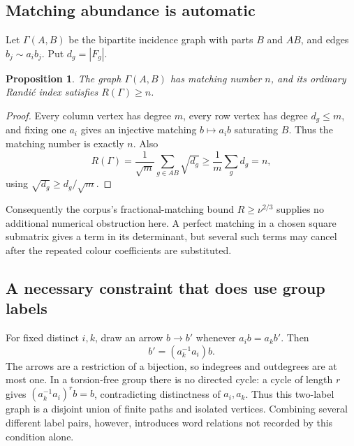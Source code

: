 \documentclass[11pt,a4paper,oneside]{report}
\newtheorem{proposition}[theorem]{Proposition}
\theoremstyle{definition}
\theoremstyle{remark}
\begin{document}
\subsection{Matching abundance is automatic}
Let \(\Gamma(A,B)\) be the bipartite incidence graph with parts \(B\) and \(AB\), and edges \(b_j\sim a_i b_j\). Put \(d_g=|F_g|\).
\begin{proposition}\label{M02:prop:matching}
The graph \(\Gamma(A,B)\) has matching number \(n\), and its ordinary Randi\'c index satisfies \(R(\Gamma)\ge n\).
\end{proposition}
\begin{proof}
Every column vertex has degree \(m\), every row vertex has degree \(d_g\le m\), and fixing one \(a_i\) gives an injective matching \(b\mapsto a_i b\) saturating \(B\). Thus the matching number is exactly \(n\). Also
\[
R(\Gamma)=\frac1{\sqrt m}\sum_{g\in AB}\sqrt{d_g}
\ge\frac1m\sum_gd_g=n,
\]
using \(\sqrt{d_g}\ge d_g/\sqrt m\).
\end{proof}
Consequently the corpus's fractional-matching bound \(R\ge\nu^{2/3}\) supplies no additional numerical obstruction here. A perfect matching in a chosen square submatrix gives a term in its determinant, but several such terms may cancel after the repeated colour coefficients are substituted.

\subsection{A necessary constraint that does use group labels}
For fixed distinct \(i,k\), draw an arrow \(b\to b'\) whenever \(a_i b=a_k b'\). Then
\[
b'=(a_k^{-1}a_i)b.
\]
The arrows are a restriction of a bijection, so indegrees and outdegrees are at most one. In a torsion-free group there is no directed cycle: a cycle of length \(r\) gives \((a_k^{-1}a_i)^r b=b\), contradicting distinctness of \(a_i,a_k\). Thus this two-label graph is a disjoint union of finite paths and isolated vertices. Combining several different label pairs, however, introduces word relations not recorded by this condition alone.
\end{document}
